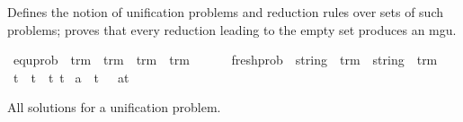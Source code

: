 %
\begin{isabellebody}%
%
%
\isadelimtheory
%
\endisadelimtheory
%
\isatagtheory
%
\endisatagtheory
{\isafoldtheory}%
%
\isadelimtheory
%
\endisadelimtheory
%
\isadelimdocument
%
\endisadelimdocument
%
\isatagdocument
%
\isamarkuptrue%
%
\endisatagdocument
{\isafolddocument}%
%
\isadelimdocument
%
\endisadelimdocument
%
\begin{isamarkuptext}%
Defines the notion of unification problems and reduction rules over sets of
 such problems; proves that every reduction leading to the empty set produces an mgu.%
\end{isamarkuptext}\isamarkuptrue%
\isamarkupfalse%
\ equ{\isacharunderscore}{\kern0pt}prob\ {\isacharcolon}{\kern0pt}{\isacharcolon}{\kern0pt}\ {\isachardoublequoteopen}trm\ {\isasymRightarrow}\ trm\ {\isasymRightarrow}\ {\isacharparenleft}{\kern0pt}trm\ {\isasymtimes}\ trm{\isacharparenright}{\kern0pt}{\isachardoublequoteclose}\ \ {\isacharparenleft}{\kern0pt}\ {\isachardoublequoteopen}{\isasymapprox}{\isacharquery}{\kern0pt}{\isachardoublequoteclose}\ {}{}{\isacharparenright}{\kern0pt}\isanewline
\ \ fresh{\isacharunderscore}{\kern0pt}prob\ {\isacharcolon}{\kern0pt}{\isacharcolon}{\kern0pt}\ {\isachardoublequoteopen}string\ {\isasymRightarrow}\ trm\ {\isasymRightarrow}\ {\isacharparenleft}{\kern0pt}string\ {\isasymtimes}\ trm{\isacharparenright}{\kern0pt}{\isachardoublequoteclose}\ {\isacharparenleft}{\kern0pt}\ {\isachardoublequoteopen}{\isasymsharp}{\isacharquery}{\kern0pt}{\isachardoublequoteclose}\ {}{}{\isacharparenright}{\kern0pt}\isanewline
{}\isamarkupfalse%
\isanewline
\ {\isachardoublequoteopen}t{}\ {\isasymapprox}{\isacharquery}{\kern0pt}\ t{}{\isachardoublequoteclose}\ {\isasymrightharpoonup}\ {\isachardoublequoteopen}{\isacharparenleft}{\kern0pt}t{}{\isacharcomma}{\kern0pt}\ t{}{\isacharparenright}{\kern0pt}{\isachardoublequoteclose}\isanewline
\ {\isachardoublequoteopen}a\ {\isasymsharp}{\isacharquery}{\kern0pt}\ t{\isachardoublequoteclose}\ \ {\isasymrightharpoonup}\ {\isachardoublequoteopen}{\isacharparenleft}{\kern0pt}a{\isacharcomma}{\kern0pt}t{\isacharparenright}{\kern0pt}{\isachardoublequoteclose}%
\begin{isamarkuptext}%
All solutions for a unification problem.%
\end{isamarkuptext}\isamarkuptrue%

\end{isabellebody}
